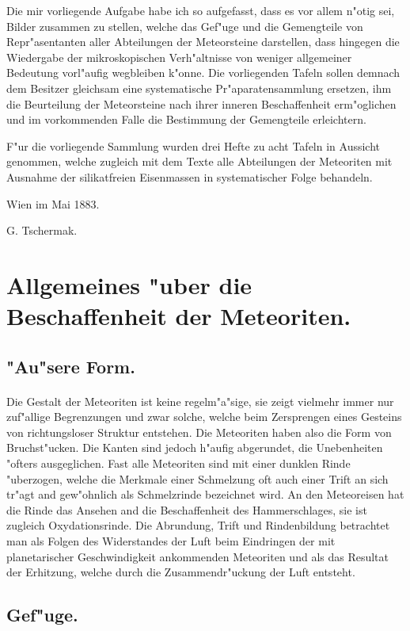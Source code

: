 \documentclass[a4paper, 11pt, oneside, polutonikogreek, german]{article}
\begin{document}
Die mir vorliegende Aufgabe habe ich so aufgefasst, dass es vor allem n"otig sei, Bilder zusammen zu stellen, welche das Gef"uge und die Gemengteile von Repr"asentanten aller Abteilungen der Meteorsteine darstellen, dass hingegen die Wiedergabe der mikroskopischen Verh"altnisse von weniger allgemeiner Bedeutung vorl"aufig wegbleiben k"onne. Die vorliegenden Tafeln sollen demnach dem Besitzer gleichsam eine systematische Pr"aparatensammlung ersetzen, ihm die Beurteilung der Meteorsteine nach ihrer inneren Beschaffenheit erm"oglichen und im vorkommenden Falle die Bestimmung der Gemengteile erleichtern.

F"ur die vorliegende Sammlung wurden drei Hefte zu acht Tafeln in Aussicht genommen, welche zugleich mit dem Texte alle Abteilungen der Meteoriten mit Ausnahme der silikatfreien Eisenmassen in systematischer Folge behandeln.

Wien im Mai 1883.

G. Tschermak.
\clearpage
\section{Allgemeines "uber die Beschaffenheit der Meteoriten.}
\subsection{"Au"sere Form.}
\paragraph*{}
Die Gestalt der Meteoriten ist keine regelm"a"sige, sie zeigt vielmehr immer nur zuf"allige Begrenzungen und zwar solche, welche beim Zersprengen eines Gesteins von richtungsloser Struktur entstehen. Die Meteoriten haben also die Form von Bruchst"ucken. Die Kanten sind jedoch h"aufig abgerundet, die Unebenheiten "ofters ausgeglichen. Fast alle Meteoriten sind mit einer dunklen Rinde "uberzogen, welche die Merkmale einer Schmelzung oft auch einer Trift an sich tr"agt and gew"ohnlich als Schmelzrinde bezeichnet wird. An den Meteoreisen hat die Rinde das Ansehen and die Beschaffenheit des Hammerschlages, sie ist zugleich Oxydationsrinde. Die Abrundung, Trift und Rindenbildung betrachtet man als Folgen des Widerstandes der Luft beim Eindringen der mit planetarischer Geschwindigkeit ankommenden Meteoriten und als das Resultat der Erhitzung, welche durch die Zusammendr"uckung der Luft entsteht.

\subsection{Gef"uge.}
\end{document}
